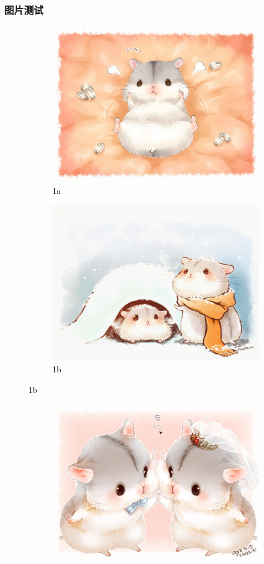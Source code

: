 \documentclass[presentation,aspectratio=1610]{beamer}
\begin{document}
\begin{frame}
\frametitle{图片测试}
	\begin{figure}
		\begin{subfigure}{0.45\textwidth}
		  \centering
		  \includegraphics[width=0.6\linewidth]{image1.jpg}
		  \caption{1a}
		  \label{fig:sfig1}
		\end{subfigure}%
		\begin{subfigure}{0.45\textwidth}
		  \centering
		  \includegraphics[width=0.6\linewidth]{image2.jpg}
		  \caption{1b}
		  \label{fig:sfig2}
		\end{subfigure}
	\end{figure}
	\begin{figure}
	\begin{subfigure}{0.45\textwidth}
		\centering
		\includegraphics[width=0.6\linewidth]{image3.jpg}

\end{subfigure}
\end{figure}
\end{frame}
\end{document}
